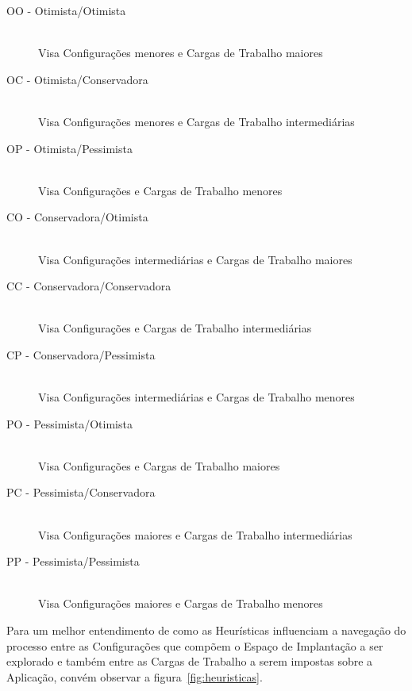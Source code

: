 \begin{description}
  \item[OO - Otimista/Otimista] \hfill \\ Visa Configurações menores e Cargas de Trabalho maiores
  \item[OC - Otimista/Conservadora] \hfill \\ Visa Configurações menores e Cargas de Trabalho intermediárias
  \item[OP - Otimista/Pessimista] \hfill \\ Visa Configurações e Cargas de Trabalho menores
  \item[CO - Conservadora/Otimista] \hfill \\ Visa Configurações intermediárias e Cargas de Trabalho maiores
  \item[CC - Conservadora/Conservadora] \hfill \\ Visa Configurações e Cargas de Trabalho intermediárias
  \item[CP - Conservadora/Pessimista] \hfill \\ Visa Configurações intermediárias e Cargas de Trabalho menores
  \item[PO - Pessimista/Otimista] \hfill \\ Visa Configurações e Cargas de Trabalho maiores
  \item[PC - Pessimista/Conservadora] \hfill \\ Visa Configurações maiores e Cargas de Trabalho intermediárias
  \item[PP - Pessimista/Pessimista] \hfill \\ Visa Configurações maiores e Cargas de Trabalho menores
\end{description}

Para um melhor entendimento de como as Heurísticas influenciam a navegação do 
processo entre as Configurações que compõem o Espaço de Implantação a ser explorado
e também entre as Cargas de Trabalho a serem impostas sobre a Aplicação, convém
observar a figura~\ref{fig:heuristicas}.

